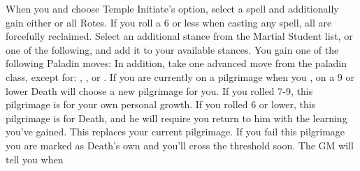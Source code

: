 \documentclass[darkmode]{dw_playbook}
\begin{document}
\pageThree
    {
        \advancedMovesCont
    }
    {
            {
            When you  and choose Temple Initiate's option, select a spell and additionally gain either  or all Rotes.  If you roll a 6 or less when casting any spell, all are forcefully reclaimed.}
        \gap
            {
            Select an additional stance from the Martial Student list, or one of the following, and add it to your available stances.
            \gapSm
            \gapSm
            \gapSm
            }
        \gap
            {
            You gain one of the following Paladin moves:
            \gapSm
            \gapSm
            \gapSm
            In addition, take one advanced move from the paladin class, except for: , , or .}
        \gap
            {If you are currently on a pilgrimage when you , on a 9 or lower Death will choose a new pilgrimage for you.  If you rolled 7-9, this pilgrimage is for your own personal growth.  If you rolled 6 or lower, this pilgrimage is for Death, and he will require you return to him with the learning you’ve gained.  This replaces your current pilgrimage.  If you fail this pilgrimage you are marked as Death’s own and you’ll cross the threshold soon.  The GM will tell you when}
    }
    {
        ~
    }
\end{document}
